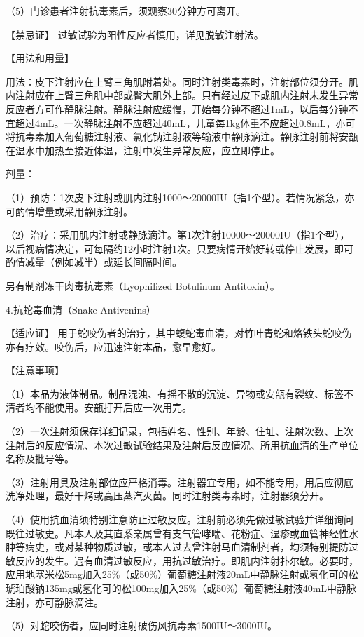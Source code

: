 （5）门诊患者注射抗毒素后，须观察30分钟方可离开。

【禁忌证】 过敏试验为阳性反应者慎用，详见脱敏注射法。

【用法和用量】

用法：皮下注射应在上臂三角肌附着处。同时注射类毒素时，注射部位须分开。肌内注射应在上臂三角肌中部或臀大肌外上部。只有经过皮下或肌内注射未发生异常反应者方可作静脉注射。静脉注射应缓慢，开始每分钟不超过1mL，以后每分钟不宜超过4mL。一次静脉注射不应超过40mL，儿童每1kg体重不应超过0.8mL，亦可将抗毒素加入葡萄糖注射液、氯化钠注射液等输液中静脉滴注。静脉注射前将安瓿在温水中加热至接近体温，注射中发生异常反应，应立即停止。

剂量：

（1）预防：1次皮下注射或肌内注射1000～20000IU（指1个型）。若情况紧急，亦可酌情增量或采用静脉注射。

（2）治疗：采用肌内注射或静脉滴注。第1次注射10000～20000IU（指1个型），以后视病情决定，可每隔约12小时注射1次。只要病情开始好转或停止发展，即可酌情减量（例如减半）或延长间隔时间。

另有制剂冻干肉毒抗毒素（Lyophilized Botulinum Antitoxin）。

4.抗蛇毒血清（Snake Antivenins）

【适应证】
用于蛇咬伤者的治疗，其中蝮蛇毒血清，对竹叶青蛇和烙铁头蛇咬伤亦有疗效。咬伤后，应迅速注射本品，愈早愈好。

【注意事项】

（1）本品为液体制品。制品混浊、有摇不散的沉淀、异物或安瓿有裂纹、标签不清者均不能使用。安瓿打开后应一次用完。

（2）一次注射须保存详细记录，包括姓名、性别、年龄、住址、注射次数、上次注射后的反应情况、本次过敏试验结果及注射后反应情况、所用抗血清的生产单位名称及批号等。

（3）注射用具及注射部位应严格消毒。注射器宜专用，如不能专用，用后应彻底洗净处理，最好干烤或高压蒸汽灭菌。同时注射类毒素时，注射器须分开。

（4）使用抗血清须特别注意防止过敏反应。注射前必须先做过敏试验并详细询问既往过敏史。凡本人及其直系亲属曾有支气管哮喘、花粉症、湿疹或血管神经性水肿等病史，或对某种物质过敏，或本人过去曾注射马血清制剂者，均须特别提防过敏反应的发生。遇有血清过敏反应，用抗过敏治疗。即肌内注射扑尔敏。必要时，应用地塞米松5mg加入25\%（或50\%）葡萄糖注射液20mL中静脉注射或氢化可的松琥珀酸钠135mg或氢化可的松100mg加入25\%（或50\%）葡萄糖注射液40mL中静脉注射，亦可静脉滴注。

（5）对蛇咬伤者，应同时注射破伤风抗毒素1500IU～3000IU。

